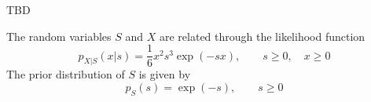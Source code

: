 \question[25] 

\ifspanish
TBD

\else

The random variables $S$ and $X$ are related through the likelihood function
\begin{equation*}
p_{X|S}(x|s) = \frac16 x ^2 s^3 \exp(-sx),    \qquad s \ge 0, \quad x \ge 0
\end{equation*}
The prior distribution of $S$ is given by
\begin{equation*}
p_S(s) = \exp(-s), \qquad  s \ge 0
\end{equation*}


